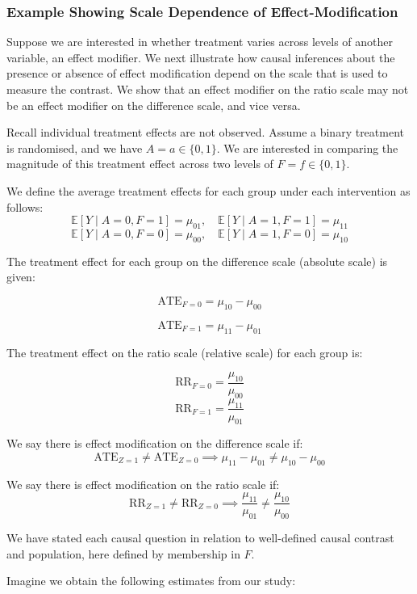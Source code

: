 \documentclass[
  single column]{article}
\begin{document}
\subsubsection{Example Showing Scale Dependence of
Effect-Modification}\label{example-showing-scale-dependence-of-effect-modification}

Suppose we are interested in whether treatment varies across levels of
another variable, an effect modifier. We next illustrate how causal
inferences about the presence or absence of effect modification depend
on the scale that is used to measure the contrast. We show that an
effect modifier on the ratio scale may not be an effect modifier on the
difference scale, and vice versa.

Recall individual treatment effects are not observed. Assume a binary
treatment is randomised, and we have \(A = a \in \{0,1\}\). We are
interested in comparing the magnitude of this treatment effect across
two levels of \(F = f \in \{0,1\}\).

We define the average treatment effects for each group under each
intervention as follows: \[
\mathbb{E}[Y \mid A = 0, F = 1] = \mu_{01}, \quad \mathbb{E}[Y \mid  A = 1, F = 1] = \mu_{11}
\] \[
\mathbb{E}[Y \mid  A = 0, F = 0] = \mu_{00}, \quad \mathbb{E}[Y \mid A = 1, F = 0] = \mu_{10}
\]

The treatment effect for each group on the difference scale (absolute
scale) is given:

\[
\text{ATE}_{F = 0} = \mu_{10} - \mu_{00}
\]

\[
\text{ATE}_{F = 1} = \mu_{11} - \mu_{01}
\]

The treatment effect on the ratio scale (relative scale) for each group
is:

\[
\text{RR}_{F = 0} = \frac{\mu_{10}}{\mu_{00}}
\] \[
\text{RR}_{F = 1} = \frac{\mu_{11}}{\mu_{01}}
\]

We say there is effect modification on the difference scale if: \[
\text{ATE}_{Z = 1} \neq \text{ATE}_{Z = 0} \implies \mu_{11} - \mu_{01} \neq \mu_{10} - \mu_{00}
\]

We say there is effect modification on the ratio scale if: \[
\text{RR}_{Z = 1} \neq \text{RR}_{Z = 0} \implies \frac{\mu_{11}}{\mu_{01}} \neq \frac{\mu_{10}}{\mu_{00}}
\]

We have stated each causal question in relation to well-defined causal
contrast and population, here defined by membership in \(F\).

Imagine we obtain the following estimates from our study:
\end{document}
